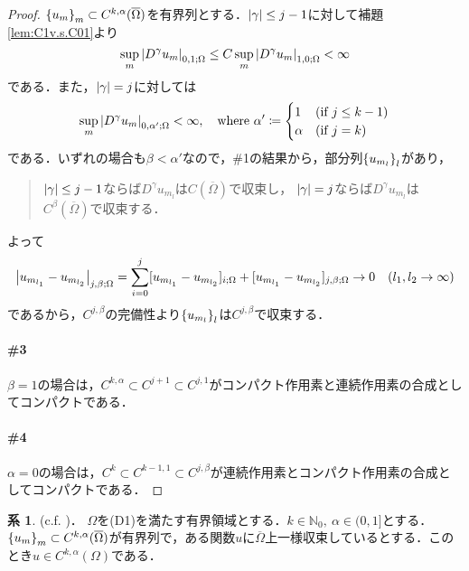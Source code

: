 \documentclass[a4paper]{ltjsarticle}
\newcommand{\Nset}{\mathbb{N}}
\newcommand{\Om}{\Omega}
\newcommand{\Ombar}{\overline{\Omega}}
\newcommand{\1}{\mathbbm{1}}
\numberwithin{equation}{section}
\theoremstyle{definition}
\newtheorem{cor}[thm]{系}
\begin{document}
\begin{proof}
    $\qty{u_m}_{m}\subset C^{k,\alpha}(\Ombar)$を有界列とする．$\abs{\gamma}\leq j-1$に対して補題\ref{lem:C1v.s.C01}より
    \begin{equation}
        \sup_{m}\abs{D^\gamma u_m}_{0,1;\Om}\leq C\sup_{m}\abs{D^\gamma u_m}_{1,0;\Om}<\infty 
    \end{equation}
    である．また，$\abs{\gamma}=j$に対しては
    \begin{equation}
        \sup_{m}\abs{D^\gamma u_m}_{0,\alpha';\Om}<\infty,\quad \text{where }\alpha'\coloneqq \begin{cases}
            1 & (\text{if }j\leq k-1)\\
            \alpha & (\text{if }j=k)
        \end{cases}
    \end{equation}
    である．いずれの場合も$\beta<\alpha'$なので，\#1の結果から，部分列$\qty{u_{m_l}}_l$があり，
    \begin{quote}
        $\abs{\gamma}\leq j-1$ならば$D^\gamma u_{m_l}$は$C(\Ombar)$で収束し，
        $\abs{\gamma}= j$ならば$D^\gamma u_{m_l}$は$C^\beta(\Ombar)$で収束する．
    \end{quote}
    よって
    \begin{equation}
        \abs{u_{m_{l_1}}-u_{m_{l_2}}}_{j,\beta;\Om}=\sum_{i=0}^{j}[u_{m_{l_1}}-u_{m_{l_2}}]_{i;\Om}+[u_{m_{l_1}}-u_{m_{l_2}}]_{j,\beta;\Om}\to 0\quad (l_1,l_2\to \infty)
    \end{equation}
    であるから，$C^{j,\beta}$の完備性より$\qty{u_{m_l}}_l$は$C^{j,\beta}$で収束する．

    \paragraph*{\#3}$\beta=1$の場合は，$C^{k,\alpha}\subset C^{j+1}\subset C^{j,1}$がコンパクト作用素と連続作用素の合成としてコンパクトである．

    \paragraph*{\#4}$\alpha=0$の場合は，$C^k\subset C^{k-1,1}\subset C^{j,\beta}$が連続作用素とコンパクト作用素の合成としてコンパクトである．
\end{proof}
\begin{cor}\label{cor:h8}(c.f. \cite[(H8)]{fr})．
    $\Om$を(D1)を満たす有界領域とする．$k\in\Nset_0,\ \alpha\in (0,1]$とする．$\qty{u_m}_m\subset C^{k,\alpha}(\Ombar)$が有界列で，ある関数$u$に$\Ombar$上一様収束しているとする．このとき$u\in C^{k,\alpha}(\Om)$である．
\end{cor}
\end{document}

